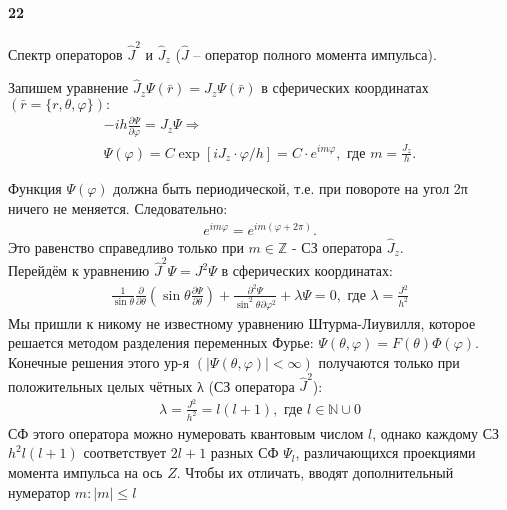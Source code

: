 \documentclass[__main__.tex]{subfiles}
\begin{document}
	\paragraph{22}
Спектр операторов $\hat{J}^2$ и $\hat{J}_z$ ($\hat{J}$ -- оператор полного момента импульса).

Запишем уравнение $\hat{J}_z\Psi(\bar r)=J_z\Psi(\bar{r})$ в сферических координатах $\left(\bar{r}=\{r,\theta,\varphi\}\right):$
\begin{gather*}
	-ih\frac{\partial\Psi}{\partial\varphi}=J_z\Psi\Rightarrow\\
	\Psi(\varphi)=C\exp\left[iJ_z\cdot \varphi/h\right]=C\cdot e^{im\varphi},\text{ где } m=\frac{J_z}{h}.
\end{gather*}	

Функция $\Psi(\varphi)$ должна быть периодической, т.е. при повороте на угол 2π ничего не меняется. Следовательно:
\begin{gather*}
	e^{im\varphi}=e^{im(\varphi+2π)}.
\end{gather*}
Это равенство справедливо только при $m\in\mathbb Z$ - СЗ оператора $\hat{J}_z.$\\

Перейдём к уравнению $\hat{J}^2\Psi=J^2\Psi$ в сферических координатах:
\begin{gather*}
	\frac{1}{\sin\theta}\frac{\partial}{\partial\theta}\left(\sin\theta\frac{\partial\Psi}{\partial\theta}\right)+\frac{\partial^2\Psi}{\sin^2\theta\partial\varphi^2}+\lambda\Psi=0,\text{ где }\lambda=\frac{J^2}{h^2}
\end{gather*}
Мы пришли к никому не известному уравнению Штурма-Лиувилля, которое решается методом разделения переменных Фурье: $\Psi\left(\theta,\varphi\right)=F(\theta)\Phi(\varphi).$ Конечные решения этого ур-я $\left(\vert\Psi(\theta,\varphi)\vert<\infty\right)$ получаются только при положительных целых чётных λ (СЗ оператора $\hat{J}^2$):
\begin{gather*}
	\lambda=\frac{J^2}{h^2}=l(l+1),\text{ где }l\in\mathbb{N}\cup0
\end{gather*}
СФ этого оператора можно нумеровать квантовым числом $l$, однако каждому СЗ $h^2l(l+1)$ соответствует $2l+1$ разных СФ $\Psi_l$, различающихся проекциями момента импульса на ось $Z.$ Чтобы их отличать, вводят дополнительный нумератор $m : \vert m\vert\le l$
\end{document}
